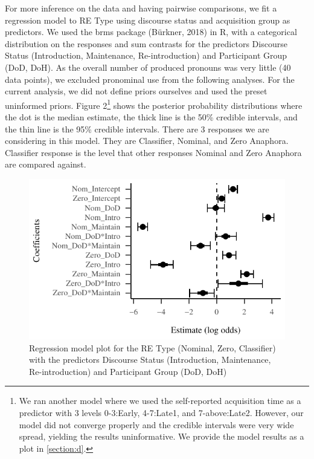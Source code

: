 \documentclass[]{elsarticle} %
\begin{document}
For more inference on the data and having pairwise comparisons, we fit a
regression model to RE Type using discourse status and acquisition group
as predictors. We used the brms package (Bürkner, 2018) in R, with a
categorical distribution on the responses and sum contrasts for the
predictors Discourse Status (Introduction, Maintenance, Re-introduction)
and Participant Group (DoD, DoH). As the overall number of produced
pronouns was very little (40 data points), we excluded pronominal use
from the following analyses. For the current analysis, we did not define
priors ourselves and used the preset uninformed priors. Figure
2\footnote{We ran another model where we used the self-reported
  acquisition time as a predictor with 3 levels 0-3:Early, 4-7:Late1,
  and 7-above:Late2. However, our model did not converge properly and
  the credible intervals were very wide spread, yielding the results
  uninformative. We provide the model results as a plot in
  \ref{section:d}.} shows the posterior probability distributions where
the dot is the median estimate, the thick line is the 50\% credible
intervals, and the thin line is the 95\% credible intervals. There are 3
responses we are considering in this model. They are Classifier,
Nominal, and Zero Anaphora. Classifier response is the level that other
responses Nominal and Zero Anaphora are compared against.

\begin{figure}
\centering
\includegraphics{revised_manuscript_files/figure-latex/model-gram-1.pdf}
\caption{Regression model plot for the RE Type (Nominal, Zero,
Classifier) with the predictors Discourse Status (Introduction,
Maintenance, Re-introduction) and Participant Group (DoD, DoH)}
\end{figure}
\end{document}
